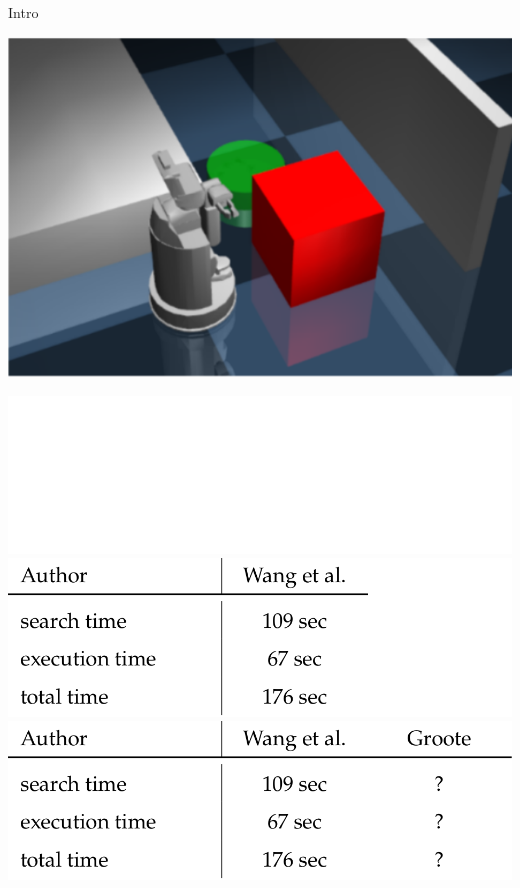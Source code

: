 \begin{frame}[fragile]{Intro}
  \begin{minipage}[l]{0.46\textwidth}
    \cite{wang_affordancebased_2020}
    \includegraphics[width=1.3\textwidth]{figures/introduction/wang}
  \end{minipage}
  \begin{minipage}[l]{0.3\textwidth}
\begin{overprint}
   \includegraphics[width=1.8\textwidth]{figures/introduction/wang_table_transparent}\vspace{3.5cm}
   \includegraphics[width=1.8\textwidth]{figures/introduction/wang_table}\vspace{3.5cm}
     \includegraphics[width=1.8\textwidth]{figures/introduction/wang_groote_table}\vspace{3.5cm}
\end{overprint}
  \end{minipage}
\end{frame}




